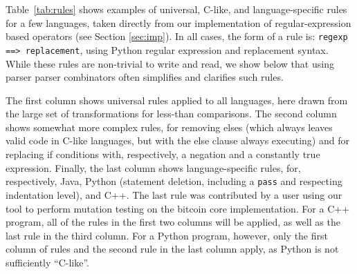 \documentclass[sigconf,review, anonymous]{acmart}
\begin{document}
{\begin{table}[hbtp]
{\begin{tabular}{|l|l|l|}
\end{tabular}
}

\end{table}



\begin{table}[hbtp]
\centering
\caption{Parser Parser Combinator Rule Examples}
\label{tab:crules}
\end{table}

  
Table~\ref{tab:rules} shows examples of universal, C-like, and
language-specific rules for a few languages, taken directly from our
implementation of regular-expression based operators (see Section \ref{sec:imp}).  In all cases, the form of a rule is: {\tt regexp
  ==> replacement}, using Python regular expression and replacement
syntax.  While these rules are non-trivial to write and read, we show
below that using parser parser combinators often simplifies and
clarifies such rules.

The first column shows universal rules applied to
all languages, here drawn from the large set of transformations for
less-than comparisons.  The second column shows somewhat more
complex rules, for removing elses (which always leaves valid code in
C-like languages, but with the else clause always executing) and for
replacing if conditions with, respectively, a negation and a
constantly true expression.  Finally, the last column shows
language-specific rules, for, respectively, Java, Python (statement
deletion, including a {\tt pass} and respecting indentation level),
and C++.  The last rule was contributed by a user using our tool to
perform mutation testing on the bitcoin core implementation.  For a
C++ program, all of the rules in the first two columns will be
applied, as well as the last rule in the third column.  For a Python
program, however, only the first column of rules and the second rule
in the last column apply, as Python is not sufficiently ``C-like''.


}
\end{document}
